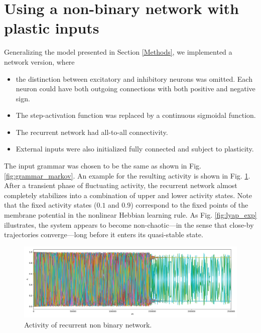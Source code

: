\documentclass[10pt,a4paper]{article}
\begin{document}
\section{Using a non-binary network with plastic inputs}

Generalizing the model presented in Section \ref{Methods}, we implemented a network version, where
\begin{itemize}
\item the distinction between excitatory and inhibitory neurons was omitted. Each neuron could have both outgoing connections with both positive and negative sign.
\item The step-activation function was replaced by a continuous sigmoidal function.
\item The recurrent network had all-to-all connectivity.
\item External inputs were also initialized fully connected and subject to plasticity.
\end{itemize}

The input grammar was chosen to be the same as shown in Fig. \ref{fig:grammar_markov}. An example for the resulting activity is shown in Fig. \ref{fig:act_plot_non_bin}. After a transient phase of fluctuating activity, the recurrent network almost completely stabilizes into a combination of upper and lower activity states. Note that the fixed activity states ($0.1$ and $0.9$) correspond to the fixed points of the membrane potential in the nonlinear Hebbian learning rule. As Fig. \ref{fig:lyap_exp} illustrates, the system appears to become non-chaotic---in the sense that close-by trajectories converge---long before it enters its quasi-stable state. 

\begin{figure}
\begin{center}
\includegraphics[width=\textwidth]{../../code/rnn_prox_dist_non_bin/plots/plastic_input_weights_small_init/activity_plot.png}
\end{center}
\label{fig:act_plot_non_bin}
\caption{Activity of recurrent non binary network.}
\end{figure}
\end{document}
